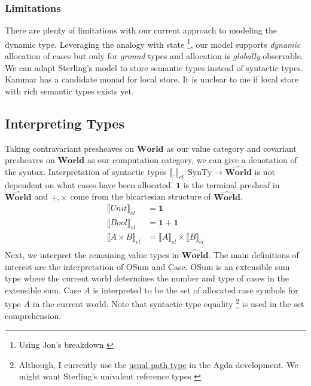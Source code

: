 \documentclass{article}
\newcommand{\pworld}{\widehat{\mathbf{World}}}
\newcommand{\world}{{\mathbf{World}}}
\begin{document}
\subsubsection{Limitations}
There are plenty of limitations with our current approach to modeling the dynamic type. Leveraging the analogy with state
\footnote{Using Jon's breakdown \cite{sterlingFreeTheoremsUnivalent}}, our model supports \textit{dynamic} allocation of cases but only 
for \textit{ground} types and allocation is \textit{globally} observable. We can adapt Sterling's model\cite{sterling_denotational_2023}
to store semantic types instead of syntactic types. Kammar has a candidate monad for local store\cite{kammarMonadFullGround2017}. 
It is unclear to me if local store with rich semantic types exists yet.

\subsection{Interpreting Types}
Taking contravariant presheaves on $\world$ as our value category and covariant presheaves on $\world$ as our computation category,
we can give a denotation of the syntax. Interpretation of syntactic types $\llbracket\_\rrbracket_{el} : \textrm{SynTy} \rightarrow \pworld$ 
is not dependent on what cases have been allocated. $\mathbf{1}$ is the terminal presheaf in $\pworld$ and $+,\times$ come from the 
bicartesian structure of $\pworld$.
\begin{align*}
    \llbracket Unit \rrbracket_{el} &= \mathbf{1}\\
    \llbracket Bool \rrbracket_{el} &= \mathbf{1}  + \mathbf{1}\\
    \llbracket A \times B \rrbracket_{el} &= \llbracket A \rrbracket_{el} \times \llbracket B \rrbracket_{el} \\
\end{align*}
Next, we interpret the remaining value types in $\pworld$. The main definitions of interest are the interpretation of OSum and Case. 
OSum is an extensible sum type where the current world determines the number and type of cases in the extensible sum. 
Case $A$ is interpreted to be the set of allocated case symbols for type $A$ in the current world. Note that syntactic type equality
\footnote{Although, I currently use the 
\href{https://github.com/bond15/Bunched-CBPV/blob/1538ee3b3e1da806ec44bf635b35a5284ebb4924/src/Models/FuturePast.agda#L201}{usual path type} 
in the Agda development. We might want Sterling's univalent reference types \cite{sterlingFreeTheoremsUnivalent}} is used in the set comprehension. 
\end{document}
